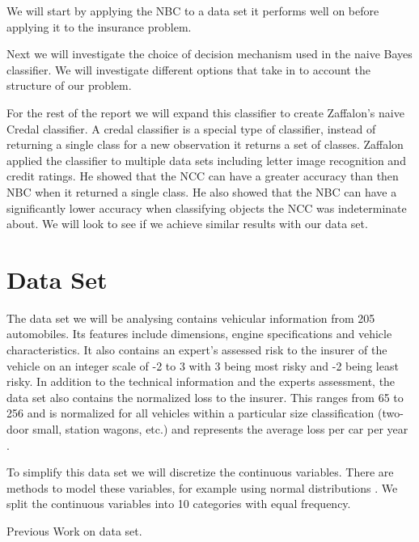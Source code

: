 We will start by applying the NBC to a data set it performs well on before applying it to the insurance problem.

Next we will investigate the choice of decision mechanism used in the naive Bayes classifier.
We will investigate different options that take in to account the structure of our problem.

For the rest of the report we will expand this classifier to create Zaffalon's \cite{Zaffalon01} naive Credal classifier.
A credal classifier is a special type of classifier, instead of returning a single class for a new observation it returns a set of classes.
Zaffalon applied the classifier to multiple data sets including letter image recognition and credit ratings.
He showed that the NCC can have a greater accuracy than then NBC when it returned a single class.
He also showed that the NBC can have a significantly lower accuracy when classifying objects the NCC was indeterminate about.
We will look to see if we achieve similar results with our data set.

\section{Data Set}

The data set we will be analysing contains vehicular information from 205 automobiles.
Its features include dimensions, engine specifications and vehicle characteristics.
It also contains an expert's assessed risk to the insurer of the vehicle on an integer scale of -2 to 3 with 3 being most risky and -2 being least risky.
In addition to the technical information and the experts assessment, the data set also contains the normalized loss to the insurer.
This ranges from 65 to 256 and is normalized for all vehicles within a particular size classification (two-door small, station wagons, etc.) and represents the average loss per car per year \cite{Automobile}.

To simplify this data set we will discretize the continuous variables.
There are methods to model these variables, for example using normal distributions \cite{Dumitru09}.
We split the continuous variables into 10 categories with equal frequency.

Previous Work on data set.